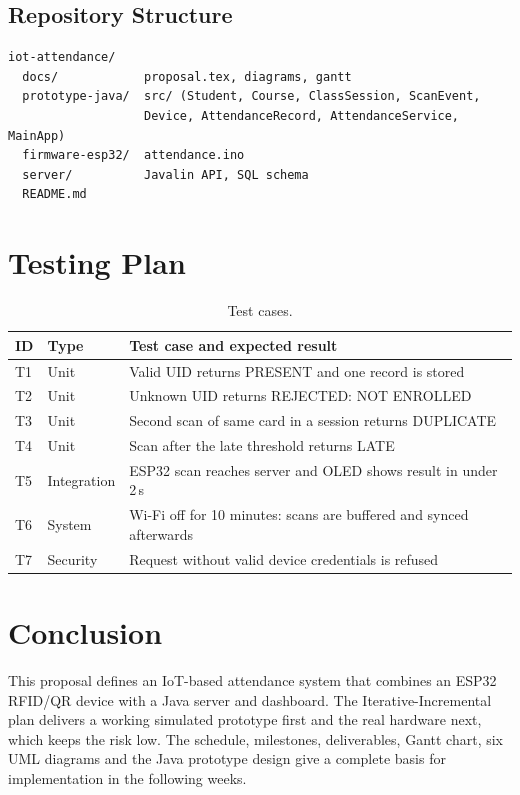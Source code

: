 \documentclass[11pt,a4paper]{article}
\begin{document}
\subsection{Repository Structure}
\begin{lstlisting}[basicstyle=\ttfamily\footnotesize,frame=single]
iot-attendance/
  docs/            proposal.tex, diagrams, gantt
  prototype-java/  src/ (Student, Course, ClassSession, ScanEvent,
                   Device, AttendanceRecord, AttendanceService, MainApp)
  firmware-esp32/  attendance.ino
  server/          Javalin API, SQL schema
  README.md
\end{lstlisting}
 
\section{Testing Plan}
\begin{table}[H]
\centering
\small
\begin{tabular}{llp{6.2cm}}
\toprule
\textbf{ID} & \textbf{Type} & \textbf{Test case and expected result}\\
\midrule
T1 & Unit & Valid UID returns PRESENT and one record is stored\\
T2 & Unit & Unknown UID returns REJECTED: NOT ENROLLED\\
T3 & Unit & Second scan of same card in a session returns DUPLICATE\\
T4 & Unit & Scan after the late threshold returns LATE\\
T5 & Integration & ESP32 scan reaches server and OLED shows result in under 2\,s\\
T6 & System & Wi-Fi off for 10 minutes: scans are buffered and synced afterwards\\
T7 & Security & Request without valid device credentials is refused\\
\bottomrule
\end{tabular}
\caption{Test cases.}
\end{table}
 
\section{Conclusion}
This proposal defines an IoT-based attendance system that combines an ESP32 RFID/QR device with a Java server and dashboard. The Iterative-Incremental plan delivers a working simulated prototype first and the real hardware next, which keeps the risk low. The schedule, milestones, deliverables, Gantt chart, six UML diagrams and the Java prototype design give a complete basis for implementation in the following weeks.
 
\end{document}
